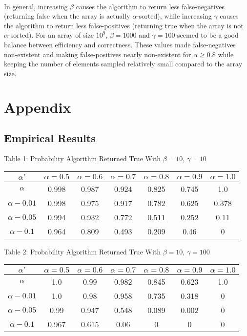 \documentclass{article}
\begin{document}
\paragraph{}In general, increasing $\beta$ causes the algorithm to return less false-negatives (returning false when the array is actually $\alpha$-sorted), while increasing $\gamma$ causes the algorithm to return less false-positives (returning true when the array is not $\alpha$-sorted). For an array of size $10^9$, $\beta=1000$ and $\gamma=100$ seemed to be a good balance between efficiency and correctness.
These values made false-negatives non-existent and making false-positives nearly non-existent for $\alpha \geq 0.8$ while keeping the number of elements sampled relatively small compared to the array size.
\section{Appendix}
\subsection{Empirical Results}
\begin{center}
Table 1: Probability Algorithm Returned True With $\beta=10$, $\gamma=10$ \\
\begin{tabular}{|c|c|c|c|c|c|c|}
\hline
$\alpha'$ & $\alpha = 0.5$ & $\alpha = 0.6$ & $\alpha = 0.7$ & $\alpha = 0.8$ & $\alpha = 0.9$ & $\alpha = 1.0$ \\
\hline
$\alpha$ & 0.998 & 0.987 & 0.924 & 0.825 & 0.745 & 1.0 \\
\hline
$\alpha-0.01$ & 0.998 & 0.975 & 0.917 & 0.782 & 0.625 & 0.378 \\
\hline
$\alpha-0.05$ & 0.994 & 0.932 & 0.772 & 0.511 & 0.252 & 0.11 \\
\hline
$\alpha-0.1$ & 0.964 & 0.809 & 0.493 & 0.209 & 0.46 & 0 \\
\hline
\end{tabular}
\end{center}

\begin{center}
Table 2: Probability Algorithm Returned True With $\beta=10$, $\gamma=100$ \\
\begin{tabular}{|c|c|c|c|c|c|c|}
\hline
$\alpha'$ & $\alpha = 0.5$ & $\alpha = 0.6$ & $\alpha = 0.7$ & $\alpha = 0.8$ & $\alpha = 0.9$ & $\alpha = 1.0$ \\
\hline
$\alpha$ & 1.0 & 0.99 & 0.982 & 0.845 & 0.623 & 1.0 \\
\hline
$\alpha-0.01$ & 1.0 & 0.98 & 0.958 & 0.735 & 0.318 & 0 \\
\hline
$\alpha-0.05$ & 0.99 & 0.947 & 0.548 & 0.089 & 0.002 & 0 \\
\hline
$\alpha-0.1$ & 0.967 & 0.615 & 0.06 & 0 & 0 & 0 \\
\hline
\end{tabular}
\end{center}
\end{document}
